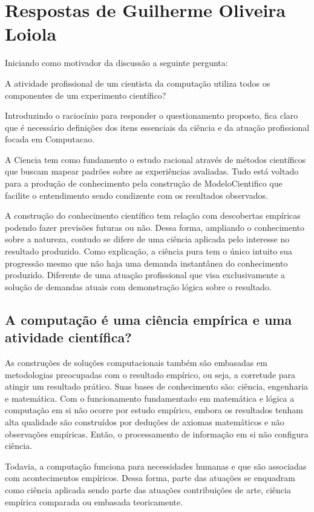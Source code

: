 \section{Respostas de Guilherme Oliveira Loiola}

Iniciando como motivador da discussão a seguinte pergunta:


A atividade profissional de um cientista da computação utiliza todos os componentes de um experimento científico?


Introduzindo o raciocínio para responder o questionamento proposto, fica claro que é necessário definições dos itens essenciais da ciência e da atuação profissional focada em \gls{Computacao}. 


A \gls{Ciencia} tem como fundamento o estudo racional através de métodos científicos que buscam mapear padrões sobre as experiências avaliadas. Tudo está voltado para a produção de conhecimento pela construção de \gls{ModeloCientifico} que facilite o entendimento sendo condizente com os resultados observados.

A construção do conhecimento científico tem relação com descobertas empíricas podendo fazer previsões futuras ou não. Dessa forma, ampliando o conhecimento sobre a natureza, contudo se difere de uma ciência aplicada pelo interesse no resultado produzido. Como explicação, a ciência pura tem o único intuito sua progressão mesmo que não haja uma demanda instantânea do conhecimento produzido. Diferente de uma atuação profissional que visa exclusivamente a solução de demandas atuais com demonstração lógica sobre o resultado.

\subsection{A computação é uma ciência empírica e uma atividade científica?}

As construções de soluções computacionais também são embasadas em metodologias preocupadas com o resultado empírico, ou seja, a corretude para atingir um resultado prático. Suas bases de conhecimento são: ciência, engenharia e matemática. Com o funcionamento fundamentado em matemática e lógica a computação em si não ocorre por estudo empírico, embora os resultados tenham alta qualidade são construídos por deduções de axiomas matemáticos e não observações empíricas. Então, o processamento de informação em si não configura ciência.

Todavia, a computação funciona para necessidades humanas e que são associadas com acontecimentos empíricos. Dessa forma, parte das atuações se enquadram como ciência aplicada sendo parte das atuações contribuições de arte, ciência empírica comparada ou embasada teoricamente.

